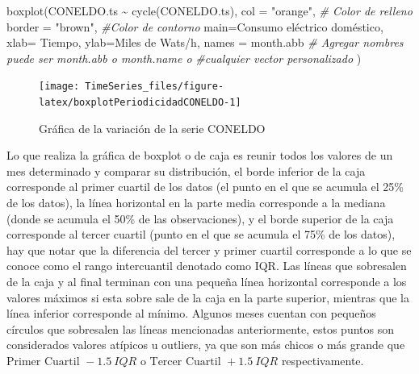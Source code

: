 \documentclass[
  spanish,
]{book}
\newenvironment{Shaded}{\begin{snugshade}}{\end{snugshade}}
\newcommand{\AttributeTok}[1]{\textcolor[rgb]{0.77,0.63,0.00}{#1}}
\newcommand{\CommentTok}[1]{\textcolor[rgb]{0.56,0.35,0.01}{\textit{#1}}}
\newcommand{\FunctionTok}[1]{\textcolor[rgb]{0.00,0.00,0.00}{#1}}
\newcommand{\NormalTok}[1]{#1}
\newcommand{\SpecialCharTok}[1]{\textcolor[rgb]{0.00,0.00,0.00}{#1}}
\newcommand{\StringTok}[1]{\textcolor[rgb]{0.31,0.60,0.02}{#1}}
\theoremstyle{remark}
\begin{document}
\begin{Shaded}
\begin{Highlighting}[]
\FunctionTok{boxplot}\NormalTok{(CONELDO.ts }\SpecialCharTok{\textasciitilde{}} \FunctionTok{cycle}\NormalTok{(CONELDO.ts),}
        \AttributeTok{col =} \StringTok{"orange"}\NormalTok{, }\CommentTok{\# Color de relleno}
        \AttributeTok{border =} \StringTok{"brown"}\NormalTok{, }\CommentTok{\#Color de contorno}
        \AttributeTok{main=}\StringTok{\textquotesingle{}Consumo eléctrico doméstico\textquotesingle{}}\NormalTok{,}
        \AttributeTok{xlab=} \StringTok{\textquotesingle{}Tiempo\textquotesingle{}}\NormalTok{,}
        \AttributeTok{ylab=}\StringTok{\textquotesingle{}Miles de Wats/h\textquotesingle{}}\NormalTok{,}
        \AttributeTok{names =}\NormalTok{ month.abb }\CommentTok{\# Agregar nombres puede ser month.abb o month.name o }
                          \CommentTok{\#cualquier vector personalizado}
\NormalTok{        )}
\end{Highlighting}
\end{Shaded}

\begin{figure}

{\centering \texttt{[image: TimeSeries\_files/figure-latex/boxplotPeriodicidadCONELDO-1]} 

}

\caption{Gráfica de la variación de la serie CONELDO}\label{fig:boxplotPeriodicidadCONELDO}
\end{figure}

Lo que realiza la gráfica de boxplot o de caja es reunir todos los valores de un mes determinado y comparar su distribución, el borde inferior de la caja corresponde al primer cuartil de los datos (el punto en el que se acumula el 25\% de los datos), la línea horizontal en la parte media corresponde a la mediana (donde se acumula el 50\% de las observaciones), y el borde superior de la caja corresponde al tercer cuartil (punto en el que se acumula el 75\% de los datos), hay que notar que la diferencia del tercer y primer cuartil corresponde a lo que se conoce como el rango intercuantil denotado como IQR. Las líneas que sobresalen de la caja y al final terminan con una pequeña línea horizontal corresponde a los valores máximos si esta sobre sale de la caja en la parte superior, mientras que la línea inferior corresponde al mínimo. Algunos meses cuentan con pequeños círculos que sobresalen las líneas mencionadas anteriormente, estos puntos son considerados valores atípicos u outliers, ya que son más chicos o más grande que \(\mbox{Primer Cuartil } -1.5 \ IQR\) o \(\mbox{Tercer Cuartil }+1.5 \ IQR\) respectivamente.
\end{document}
